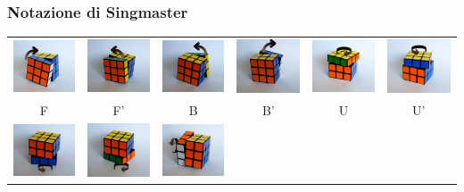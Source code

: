 \documentclass{beamer}
\begin{document}
\begin{frame}
\frametitle{Notazione di Singmaster}
\begin{table}[h]
\begin{tabular}{cccccc}
\includegraphics[width=.12\textwidth]{../graphics/moves/F.png} &
\includegraphics[width=.12\textwidth]{../graphics/moves/F_inv.png} &
\includegraphics[width=.12\textwidth]{../graphics/moves/B.png} &
\includegraphics[width=.12\textwidth]{../graphics/moves/B_inv.png} &
\includegraphics[width=.12\textwidth]{../graphics/moves/U.png} &
\includegraphics[width=.12\textwidth]{../graphics/moves/U_inv.png} \\
F & F' & B & B' & U & U' \\
\includegraphics[width=.12\textwidth]{../graphics/moves/D.png} &
\includegraphics[width=.12\textwidth]{../graphics/moves/D_inv.png} &
\includegraphics[width=.12\textwidth]{../graphics/moves/L.png} &

\end{tabular}
\end{table}
\end{frame}
\end{document}
